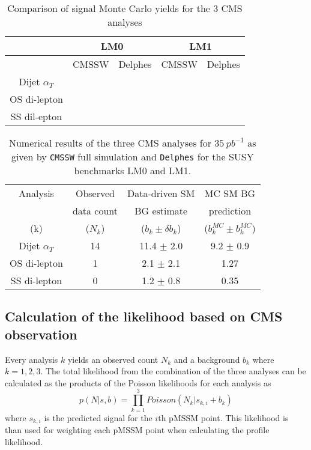 \begin{table}[htdp]
\caption{Comparison of signal Monte Carlo yields for the 3 CMS analyses}
\begin{center}
\begin{tabular}{|c|cc|cc|}
\hline
& \multicolumn{2}{|c|}{LM0} & \multicolumn{2}{|c|}{LM1} \\
\hline
& CMSSW & Delphes & CMSSW & Delphes \\
\hline
Dijet $\alpha_T$ & & & & \\
OS di-lepton & & & & \\
SS dil-epton & & & & \\
\hline
\end{tabular}
\end{center}
\label{default}
\end{table}%


\begin{table}[htdp]
\caption{Numerical results of the three CMS analyses for $35~pb^{-1}$ as given by {\tt CMSSW} full simulation and {\tt Delphes} for the SUSY benchmarks LM0 and LM1.}
\begin{center}
\begin{tabular}{|c|c|c|c|}
\hline
Analysis & Observed  & Data-driven SM & MC SM BG \\
              & data count & BG estimate      & prediction    \\
(k)          & ($N_k$)     & ($b_k \pm \delta b_k$) & ($b_k^{MC} \pm b_k^{MC}$) \\
\hline              
Dijet $\alpha_T$ & 14 & 11.4 $\pm$ 2.0 & 9.2 $\pm$ 0.9 \\
OS di-lepton & 1 & 2.1 $\pm$ 2.1 & 1.27 \\
SS di-lepton & 0 & 1.2 $\pm$ 0.8 & 0.35 \\
\hline
\end{tabular}
\end{center}
\label{default}
\end{table}%



\subsection{Calculation of the likelihood based on CMS observation}

Every analysis $k$ yields an observed count $N_k$ and a background $b_k$ where $k=1,2,3$.  The total likelihood from the combination of the three analyses can be calculated as the products of the Poisson likelihoods for each analysis as
\begin{equation}
p(N|s,b) = \prod_{k=1}^3 Poisson(N_k|s_{k,i} + b_k)
\end{equation}
where $s_{k,i}$ is the predicted signal for the $i$th pMSSM point.  This likelihood is than used for weighting each pMSSM point when calculating the profile likelihood. 

